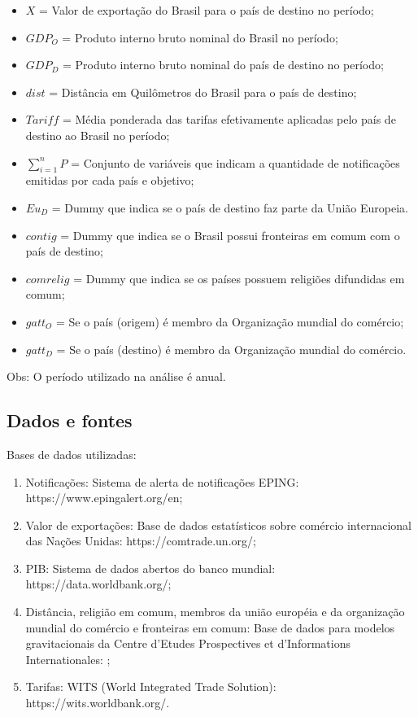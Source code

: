 \documentclass[12pt, a4paper]{article}
\begin{document}
\begin{itemize}
    \item $X$ = Valor de exportação do Brasil para o país de destino no período;
    \item $GDP_{O}$ = Produto interno bruto nominal do Brasil no período;
    \item $GDP_{D}$ = Produto interno bruto nominal do país de destino no período;
    \item $dist$ = Distância em Quilômetros  do Brasil para o país de destino;
    \item $Tariff$ = Média ponderada das tarifas efetivamente aplicadas pelo país de destino ao Brasil no período;
    \item $\sum_{i=1}^{n} P$ = Conjunto de variáveis que indicam a quantidade de notificações emitidas por cada país e objetivo;
    \item $Eu_{D}$ = Dummy que indica se o país de destino faz parte da União Europeia.
    \item $contig$ = Dummy que indica se o Brasil possui fronteiras em comum com o país de destino;
    \item $comrelig$ = Dummy que indica se os países possuem religiões difundidas em comum;
    \item $gatt_O$ = Se o país (origem) é membro da Organização mundial do comércio;
    \item $gatt_D$ = Se o país (destino) é membro da Organização mundial do comércio.
\end{itemize}

Obs: O período utilizado na análise é anual.

\subsection{Dados e fontes}

Bases de dados utilizadas:

\begin{enumerate}
    \item Notificações: Sistema de alerta de notificações EPING: https://www.epingalert.org/en;
    \item Valor de exportações: Base de dados estatísticos sobre comércio internacional das Nações Unidas: https://comtrade.un.org/;
    \item PIB: Sistema de dados abertos do banco mundial: https://data.worldbank.org/;
    \item Distância, religião em comum, membros da união européia e da organização mundial do comércio e fronteiras em comum: Base de dados para modelos gravitacionais da Centre d'Etudes Prospectives et d'Informations Internationales: \cite{CEPII};
    \item Tarifas: WITS (World Integrated Trade Solution): https://wits.worldbank.org/.
\end{enumerate}
\end{document}
